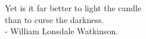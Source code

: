 
\vspace*{6.5cm}
\begin{textsl}
{
\large \rmfamily 
\hspace*{2.8cm} Yet is it far better to light the candle \\
\hspace*{2.8cm} than to curse the darkness.  \\
\hspace*{4cm} - William Lonsdale Watkinson.
}
\end{textsl}


\cleardoublepage

